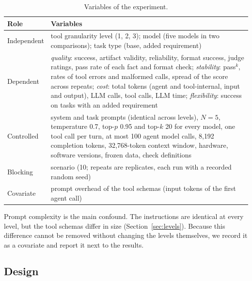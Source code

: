 \begin{table}[t]
  \caption{Variables of the experiment.}
  \label{tab:variables}
  \centering
  \small
  \begin{tabularx}{\linewidth}{@{}l>{\raggedright\arraybackslash}X@{}}
    \toprule
    Role & Variables \\
    \midrule
    Independent & tool granularity level (1, 2, 3); model (five models in two comparisons); task type (base, added requirement) \\
    \addlinespace
    Dependent & \emph{quality}: success, artifact validity, reliability, format success, judge ratings, pass rate of each fact and format check; \emph{stability}: pass$^k$, rates of tool errors and malformed calls, spread of the score across repeats; \emph{cost}: total tokens (agent and tool-internal, input and output), LLM calls, tool calls, LLM time; \emph{flexibility}: success on tasks with an added requirement \\
    \addlinespace
    Controlled & system and task prompts (identical across levels), $N=5$, temperature 0.7, top-$p$ 0.95 and top-$k$ 20 for every model, one tool call per turn, at most 100 agent model calls, 8{,}192 completion tokens, 32{,}768-token context window, hardware, software versions, frozen data, check definitions \\
    \addlinespace
    Blocking & scenario (10; repeats are replicates, each run with a recorded random seed) \\
    \addlinespace
    Covariate & prompt overhead of the tool schemas (input tokens of the first agent call) \\
    \bottomrule
  \end{tabularx}
\end{table}

Prompt complexity is the main confound. The instructions are identical at every level, but the tool schemas differ in size (Section~\ref{sec:levels}). Because this difference cannot be removed without changing the levels themselves, we record it as a covariate and report it next to the results.

\subsection{Design}
\label{sec:design}

